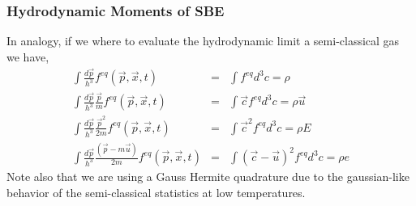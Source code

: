 \begin{frame}
	\frametitle{Hydrodynamic Moments of SBE}
	In analogy, if we where to evaluate the hydrodynamic limit a semi-classical gas we have,
	\begin{eqnarray}
	\int \frac{d\vec{p}}{h^3} f^{eq}(\vec{p},\vec{x},t) &=& \int f^{eq}d^3c = \rho \\
	\int \frac{d\vec{p}}{h^3} \frac{\vec{p}}{m} f^{eq}(\vec{p},\vec{x},t) &=& \int \vec{c} f^{eq}d^3c = \rho \vec{u} \\
	\int \frac{d\vec{p}}{h^3} \frac{\vec{p}^2}{2m} f^{eq}(\vec{p},\vec{x},t) &=& \int \vec{c}^2 f^{eq}d^3c = \rho E \\
	\int \frac{d\vec{p}}{h^3} \frac{(\vec{p}-m\vec{u})}{2m} f^{eq}(\vec{p},\vec{x},t) &=& \int (\vec{c}-\vec{u})^2 f^{eq}d^3c = \rho e 
	\end{eqnarray}
	Note also that we are using a Gauss Hermite quadrature due to the gaussian-like behavior of the semi-classical statistics at low temperatures.
\end{frame}